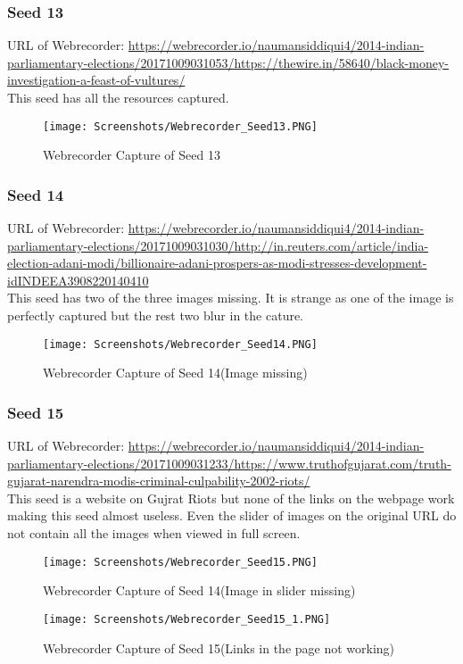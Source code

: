 \documentclass[11pt,journal,compsoc,onecolumn]{IEEEtran}
\begin{document}
\subsubsection{Seed 13}
URL of Webrecorder: 
\url{https://webrecorder.io/naumansiddiqui4/2014-indian-parliamentary-elections/20171009031053/https://thewire.in/58640/black-money-investigation-a-feast-of-vultures/}\\
This seed has all the resources captured.
 \begin{figure}[ht] 
  \centering
  \texttt{[image: Screenshots/Webrecorder\_Seed13.PNG]}
  \caption{Webrecorder Capture of Seed 13}
  \label{fig:17}
\end{figure}
\subsubsection{Seed 14}
URL of Webrecorder: 
\url{https://webrecorder.io/naumansiddiqui4/2014-indian-parliamentary-elections/20171009031030/http://in.reuters.com/article/india-election-adani-modi/billionaire-adani-prospers-as-modi-stresses-development-idINDEEA3908220140410}\\
This seed has two of the three images missing. It is strange as one of the image is perfectly captured but the rest two blur in the cature.
 \begin{figure}[ht] 
  \centering
  \texttt{[image: Screenshots/Webrecorder\_Seed14.PNG]}
  \caption{Webrecorder Capture of Seed 14(Image missing)}
  \label{fig:17}
\end{figure}
\subsubsection{Seed 15}
URL of Webrecorder: 
\url{https://webrecorder.io/naumansiddiqui4/2014-indian-parliamentary-elections/20171009031233/https://www.truthofgujarat.com/truth-gujarat-narendra-modis-criminal-culpability-2002-riots/}\\
This seed is a website on Gujrat Riots but none of the links on the webpage work making this seed almost useless. Even the slider of images on the original URL do not contain all the images when viewed in full screen.
 \begin{figure}[ht] 
  \centering
  \texttt{[image: Screenshots/Webrecorder\_Seed15.PNG]}
  \caption{Webrecorder Capture of Seed 14(Image in slider missing)}
  \label{fig:18}
\end{figure}
 \begin{figure}[ht] 
  \centering
  \texttt{[image: Screenshots/Webrecorder\_Seed15\_1.PNG]}
  \caption{Webrecorder Capture of Seed 15(Links in the page not working)}
  \label{fig:19}
\end{figure}
\end{document}
